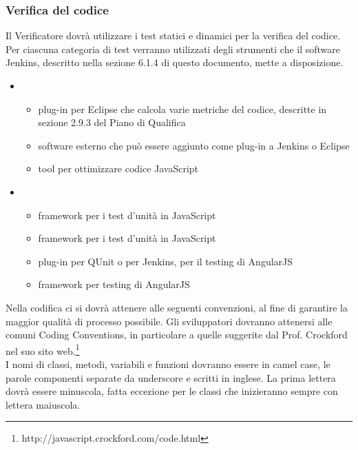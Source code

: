 \subsubsection{Verifica del codice}
Il Verificatore dovrà utilizzare i test statici e dinamici per la verifica del codice. Per ciascuna categoria di test verranno utilizzati degli strumenti che il software Jenkins, descritto nella sezione 6.1.4 di questo documento, mette a disposizione.
\begin{itemize}
\item {}
\begin{itemize}
\item {}plug-in per Eclipse che calcola varie metriche del codice, descritte in sezione 2.9.3 del Piano di Qualifica
\item {}software esterno che può essere aggiunto come plug-in a Jenkins o Eclipse
\item {}tool per ottimizzare codice JavaScript
\end{itemize}
\item {}
\begin{itemize}
\item {}framework per i test d'unità in JavaScript
\item {}framework per i test d'unità in JavaScript
\item {}plug-in per QUnit o per Jenkins, per il testing di AngularJS
\item {}framework per testing di AngularJS
\end{itemize}
\end{itemize}


\label{}
Nella codifica ci si dovrà attenere alle seguenti convenzioni, al fine di garantire la maggior qualità di processo possibile.
Gli sviluppatori dovranno attenersi alle comuni Coding Conventions, in particolare a quelle suggerite dal Prof. Crockford nel suo sito web.\footnote{http://javascript.crockford.com/code.html}\\

\label{}
I nomi di classi, metodi, variabili e funzioni dovranno essere in camel case, le parole componenti separate da underscore e scritti in inglese.
La prima lettera dovrà essere minuscola, fatta eccezione per le classi che inizieranno sempre con lettera maiuscola.

